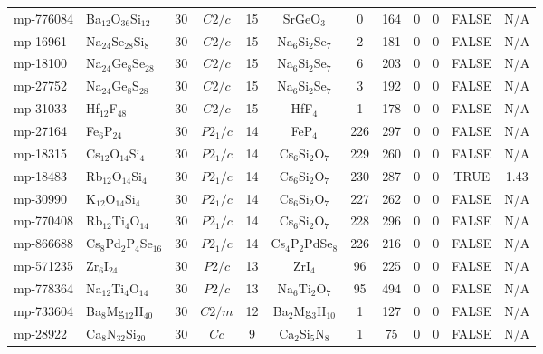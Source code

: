 {\begin{longtable}{llcccccccccc}
    mp-776084 & Ba$_{12}$O$_{36}$Si$_{12}$ & 30    & $C2/c$ & 15    & SrGeO$_{3}$ & 0     & 164   & 0     & 0     & FALSE & N/A \\
    mp-16961 & Na$_{24}$Se$_{28}$Si$_{8}$ & 30    & $C2/c$ & 15    & Na$_{6}$Si$_{2}$Se$_{7}$ & 2     & 181   & 0     & 0     & FALSE & N/A \\
    mp-18100 & Na$_{24}$Ge$_{8}$Se$_{28}$ & 30    & $C2/c$ & 15    & Na$_{6}$Si$_{2}$Se$_{7}$ & 6     & 203   & 0     & 0     & FALSE & N/A \\
    mp-27752 & Na$_{24}$Ge$_{8}$S$_{28}$ & 30    & $C2/c$ & 15    & Na$_{6}$Si$_{2}$Se$_{7}$ & 3     & 192   & 0     & 0     & FALSE & N/A \\
    mp-31033 & Hf$_{12}$F$_{48}$ & 30    & $C2/c$ & 15    & HfF$_{4}$ & 1     & 178   & 0     & 0     & FALSE & N/A \\
    mp-27164 & Fe$_{6}$P$_{24}$ & 30    & $P2_1/c$ & 14    & FeP$_{4}$ & 226   & 297   & 0     & 0     & FALSE & N/A \\
    mp-18315 & Cs$_{12}$O$_{14}$Si$_{4}$ & 30    & $P2_1/c$ & 14    & Cs$_{6}$Si$_{2}$O$_{7}$ & 229   & 260   & 0     & 0     & FALSE & N/A \\
    mp-18483 & Rb$_{12}$O$_{14}$Si$_{4}$ & 30    & $P2_1/c$ & 14    & Cs$_{6}$Si$_{2}$O$_{7}$ & 230   & 287   & 0     & 0     & TRUE  & 1.43  \\
    mp-30990 & K$_{12}$O$_{14}$Si$_{4}$ & 30    & $P2_1/c$ & 14    & Cs$_{6}$Si$_{2}$O$_{7}$ & 227   & 262   & 0     & 0     & FALSE & N/A \\
    mp-770408 & Rb$_{12}$Ti$_{4}$O$_{14}$ & 30    & $P2_1/c$ & 14    & Cs$_{6}$Si$_{2}$O$_{7}$ & 228   & 296   & 0     & 0     & FALSE & N/A \\
    mp-866688 & Cs$_{8}$Pd$_{2}$P$_{4}$Se$_{16}$ & 30    & $P2_1/c$ & 14    & Cs$_{4}$P$_{2}$PdSe$_{8}$ & 226   & 216   & 0     & 0     & FALSE & N/A \\
    mp-571235 & Zr$_{6}$I$_{24}$ & 30    & $P2/c$ & 13    & ZrI$_{4}$ & 96    & 225   & 0     & 0     & FALSE & N/A \\
    mp-778364 & Na$_{12}$Ti$_{4}$O$_{14}$ & 30    & $P2/c$ & 13    & Na$_{6}$Ti$_{2}$O$_{7}$ & 95    & 494   & 0     & 0     & FALSE & N/A \\
    mp-733604 & Ba$_{8}$Mg$_{12}$H$_{40}$ & 30    & $C2/m$ & 12    & Ba$_{2}$Mg$_{3}$H$_{10}$ & 1     & 127   & 0     & 0     & FALSE & N/A \\
    mp-28922 & Ca$_{8}$N$_{32}$Si$_{20}$ & 30    & $Cc$  & 9     & Ca$_{2}$Si$_{5}$N$_{8}$ & 1     & 75    & 0     & 0     & FALSE & N/A \\

\end{longtable}}
